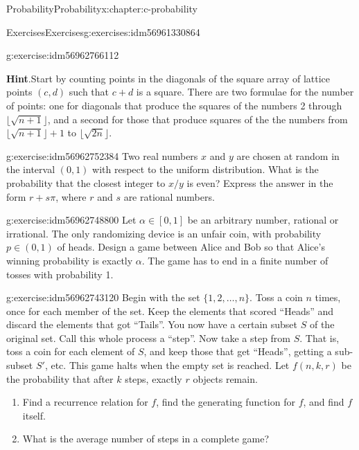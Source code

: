 \documentclass[twoside,10pt,]{book}
\newcommand{\blocktitlefont}{\relax}
\numberwithin{equation}{section}
\begin{document}
\begin{chapterptx}{Probability}{}{Probability}{}{}{x:chapter:c-probability}
\begin{exercises-section}{Exercises}{}{Exercises}{}{}{g:exercises:idm56961330864}
\begin{divisionexercise}{8}{}{}{g:exercise:idm56962766112}
\par\smallskip%
\noindent\textbf{\blocktitlefont Hint}.\hypertarget{g:hint:idm56962756688}{}\quad{}Start by counting points in the diagonals of the square array of lattice points \((c,d)\) such that \(c+d\) is a square.  There are two formulae for the number of points: one for diagonals that produce the squares of the numbers 2 through \(\lfloor \sqrt{n+1} \rfloor\), and a second for those that produce squares of the the numbers from \(\lfloor \sqrt{n+1} \rfloor +1\) to \(\lfloor \sqrt{2n} \rfloor\).%
\end{divisionexercise}%
\begin{divisionexercise}{9}{}{}{g:exercise:idm56962752384}%
Two real numbers \(x\) and \(y\) are chosen at random in the interval \((0,1)\) with respect to the uniform distribution. What is the probability that the closest integer to \(x/y\) is even? Express the answer in the form \(r + s \pi\), where \(r\) and \(s\) are rational numbers.%
\end{divisionexercise}%
\begin{divisionexercise}{10}{}{}{g:exercise:idm56962748800}%
Let \(\alpha  \in  [0,1]\) be an arbitrary number, rational or irrational. The only randomizing device is an unfair coin, with probability \(p \in (0,1)\) of heads. Design a game between Alice and Bob so that Alice's winning probability is exactly \(\alpha\). The game has to end in a finite number of tosses with probability 1.%
\end{divisionexercise}%
\begin{divisionexercise}{11}{}{}{g:exercise:idm56962743120}%
Begin with the set \(\{1,2,\dots,n\}\). Toss a coin \(n\) times, once for each member of the set. Keep the elements that scored ``Heads'' and discard the elements that got ``Tails''. You now have a certain subset \(S\) of the original set. Call this whole process a ``step''. Now take a step from \(S\). That is, toss a coin for each element of \(S\), and keep those that get ``Heads'', getting a sub-subset \(S'\), etc. This game halts when the empty set is reached. Let \(f(n,k,r)\) be the probability that after \(k\) steps, exactly \(r\) objects remain.%
\begin{enumerate}[label=(\alph*)]
\item{}Find a recurrence relation for \(f\), find the generating function for \(f\), and find \(f\) itself.%
\item{}What is the average number of steps in a complete game?%
\end{enumerate}
%
\end{divisionexercise}%

\end{exercises-section}
\end{chapterptx}
\end{document}
